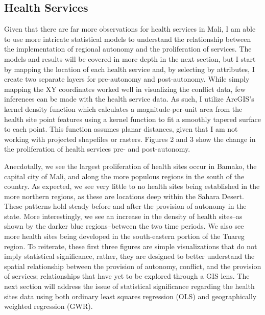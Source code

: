 \documentclass[12pt]{article}
\begin{document}
\subsection{Health Services}
Given that there are far more observations for health services in Mali, I am able to use more intricate statistical models to understand the relationship between the implementation of regional autonomy and the proliferation of services. The models and results will be covered in more depth in the next section, but I start by mapping the location of each health service and, by selecting by attributes, I create two separate layers for pre-autonomy and post-autonomy. While simply mapping the XY coordinates worked well in visualizing the conflict data, few inferences can be made with the health service data. As such, I utilize ArcGIS's kernel density function which calculates a magnitude-per-unit area from the health site point features using a kernel function to fit a smoothly tapered surface to each point. This function assumes planar distances, given that I am not working with projected shapefiles or rasters. Figures 2 and 3 show the change in the proliferation of health services pre- and post-autonomy.

Anecdotally, we see the largest proliferation of health sites occur in Bamako, the capital city of Mali, and along the more populous regions in the south of the country. As expected, we see very little to no health sites being established in the more northern regions, as these are locations deep within the Sahara Desert. These patterns hold steady before and after the provision of autonomy in the state. More interestingly, we see an increase in the density of health sites--as shown by the darker blue regions--between the two time periods. We also see more health sites being developed in the south-eastern portion of the Tuareg region. To reiterate, these first three figures are simple visualizations that do not imply statistical significance, rather, they are designed to better understand the spatial relationship between the provision of autonomy, conflict, and the provision of services; relationships that have yet to be explored through a GIS lens. The next section will address the issue of statistical significance regarding the health sites data using both ordinary least squares regression (OLS) and geographically weighted regression (GWR).
\end{document}
